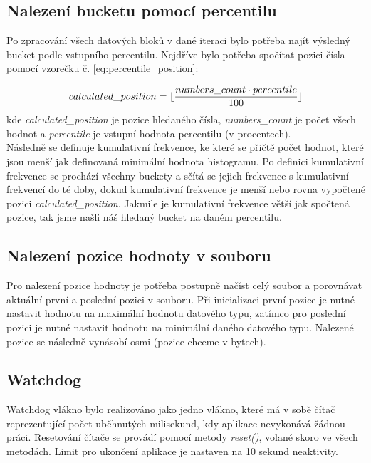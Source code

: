 \documentclass[12pt, a4paper]{article}
\newcommand{\floor}[1]{\lfloor #1 \rfloor}
\begin{document}
\subsection{Nalezení bucketu pomocí percentilu}\label{ssec:bucket_find}
Po zpracování všech datových bloků v dané iteraci bylo potřeba najít výsledný bucket podle vstupního percentilu. Nejdříve bylo potřeba spočítat pozici čísla pomocí vzorečku č. \ref{eq:percentile_position}:

\begin{equation}
calculated\_position =  \floor{\frac{numbers\_count \cdot percentile}{100}}\\
\label{eq:percentile_position} 
\end{equation}
kde \textit{calculated\_position} je pozice hledaného čísla, \textit{numbers\_count} je počet všech hodnot a \textit{percentile} je vstupní hodnota percentilu (v procentech).\\

\indent Následně se definuje kumulativní frekvence, ke které se přičtě počet hodnot, které jsou menší jak definovaná minimální hodnota histogramu. Po definici kumulativní frekvence se prochází všechny buckety a sčítá se jejich frekvence s kumulativní frekvencí do té doby, dokud kumulativní frekvence je menší nebo rovna vypočtené pozici \textit{calculated\_position}. Jakmile je kumulativní frekvence větší jak spočtená pozice, tak jsme našli náš hledaný bucket na daném percentilu.

\subsection{Nalezení pozice hodnoty v souboru}  \label{ssec:position}
Pro nalezení pozice hodnoty je potřeba postupně načíst celý soubor a porovnávat aktuální první a poslední pozici v souboru. Při inicializaci první pozice je nutné nastavit hodnotu na maximální hodnotu datového typu, zatímco pro poslední pozici je nutné nastavit hodnotu na minimální daného datového typu. Nalezené pozice se následně vynásobí osmi (pozice chceme v bytech).

\subsection{Watchdog}
Watchdog vlákno bylo realizováno jako jedno vlákno, které má v sobě čítač reprezentující počet uběhnutých milisekund, kdy aplikace nevykonává žádnou práci. Resetování čítače se provádí pomocí metody \textit{reset()}, volané skoro ve všech metodách. Limit pro ukončení aplikace je nastaven na 10 sekund neaktivity.
\end{document}
